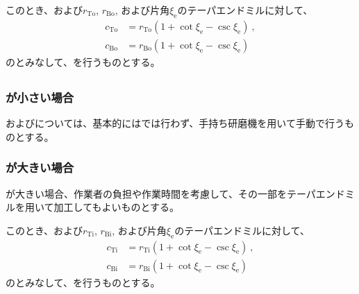 このとき、\TopEndFaceOutRChamferRadius および\BottomEndFaceOutRChamferRadius$r_\mathrm{To}$, $r_\mathrm{Bo}$, および片角$\xi_\mathrm e$のテーパエンドミルに対して、
\begin{align*}
  c_\mathrm{To} &= r_\mathrm{To}\left(1+\cot\xi_\mathrm e-\csc\xi_\mathrm e\right)\ ,\\
  c_\mathrm{Bo} &= r_\mathrm{Bo}\left(1+\cot\xi_\mathrm e-\csc\xi_\mathrm e\right)
\end{align*}
の\EndFaceOutCChamferLength とみなして、\EndFaceInCChamferMilling を行うものとする。


\subsection{\EndFaceInRChamferMilling}

\subsubsection{\EndFaceInRChamferRadius が小さい場合}
\TopEndFaceInRChamferMilling および\BottomEndFaceInRChamferMilling については、基本的には\MMC では行わず、手持ち研磨機を用いて手動で行うものとする。

\subsubsection{\EndFaceInRChamferRadius が大きい場合}
\EndFaceInRChamferRadius が大きい場合、作業者の負担や作業時間を考慮して、その一部をテーパエンドミルを用いて加工してもよいものとする。

このとき、\TopEndFaceInRChamferRadius および\BottomFaceInRChamferRadius$r_\mathrm{Ti}$, $r_\mathrm{Bi}$, および片角$\xi_\mathrm e$のテーパエンドミルに対して、
\begin{align*}
  c_\mathrm{Ti} &= r_\mathrm{Ti}\left(1+\cot\xi_\mathrm e-\csc\xi_\mathrm e\right)\ ,\\
  c_\mathrm{Bi} &= r_\mathrm{Bi}\left(1+\cot\xi_\mathrm e-\csc\xi_\mathrm e\right)
\end{align*}
の\EndFaceCChamferLength とみなして、\EndFaceInCChamferMilling を行うものとする。



